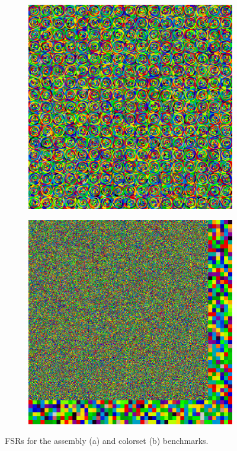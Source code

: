 \begin{figure}[ht!]
\centering
\begin{subfigure}{0.45\textwidth}
  \centering
  \includegraphics[width=0.8\linewidth]{figures/assembly/fsrs}
  \caption{}
  \label{fig:benchmarks-assm-fsrs}
\end{subfigure}%
\begin{subfigure}{0.45\textwidth}
  \centering
  \includegraphics[width=0.8\linewidth]{figures/reflector/fsrs}
  \caption{}
  \label{fig:benchmarks-reflector-fsrs}
\end{subfigure}
\caption{FSRs for the assembly (a) and colorset (b) benchmarks.}
\label{fig:benchmarks-fsrs}
\end{figure}


